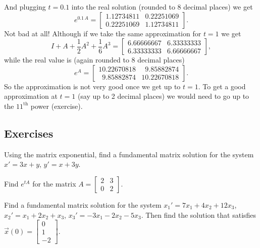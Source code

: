 And plugging $t=0.1$ into the real solution (rounded to 8 decimal places) we get
\begin{equation*}
e^{0.1\,A} = 
\begin{bmatrix}
1.12734811 & 0.22251069 \\
0.22251069 & 1.12734811
\end{bmatrix} .
\end{equation*}
Not bad at all!  Although if we take the same approximation for $t=1$
we get
\begin{equation*}
I + A + \frac{1}{2}A^2 + \frac{1}{6}A^3
=
\begin{bmatrix}
6.66666667 & 6.33333333 \\
6.33333333 & 6.66666667
\end{bmatrix} ,
\end{equation*}
while the real value is (again rounded to 8 decimal places)
\begin{equation*}
e^{A} =
\begin{bmatrix}
10.22670818           & \phantom{0}9.85882874 \\
\phantom{0}9.85882874 & 10.22670818
\end{bmatrix} .
\end{equation*}
So the approximation is not very good once we get up to $t=1$.  To get a good
approximation at $t=1$ (say up to 2 decimal places) we would need to go up to
the ${11}^{\text{th}}$ power (exercise).

\subsection{Exercises}

\begin{exercise}
Using the matrix exponential,
find a fundamental matrix solution for the system
$x' = 3x+y$, $y' = x+3y$.
\end{exercise}

\begin{exercise}
Find $e^{tA}$ for the matrix $A =
\left[ \begin{smallmatrix}
2 & 3 \\
0 & 2
\end{smallmatrix} \right]$.
\end{exercise}

\begin{exercise}
Find a fundamental matrix solution for the system
$x_1' = 7x_1+4x_2+ 12x_3$,
$x_2' = x_1+2x_2+x_3$,
$x_3' = -3x_1-2x_2- 5x_3$.  Then find the solution that
satisfies $\vec{x}(0) = 
\left[ \begin{smallmatrix} 0 \\ 1 \\ -2 \end{smallmatrix} \right]$.
\end{exercise}

